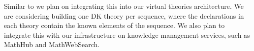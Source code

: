 Similar to \LMFDB we plan on integrating this into our virtual theories architecture. We
are considering building one DK theory per sequence, where the declarations in each theory
contain the known elements of the sequence. We also plan to integrate this with our
infrastructure on knowledge management services, such as MathHub and MathWebSearch.




